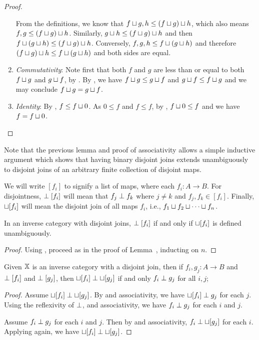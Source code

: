 \begin{proof}
\begin{enumerate}[{(}i{)}]
      From the definitions, we know that $f\sqcup g, h \le (f\sqcup g)\sqcup h$, which also means
      $f, g \le (f\sqcup g)\sqcup h$. Similarly, $g\sqcup h \le (f\sqcup g)\sqcup h $ and then $f
      \sqcup (g\sqcup h)\le (f\sqcup g)\sqcup h$. Conversely, $f,g,h \le f \sqcup (g\sqcup h)$ and
      therefore $(f\sqcup g)\sqcup h \le f \sqcup (g\sqcup h)$ and both sides are equal.
    \item \emph{Commutativity}: Note first that both $f$ and $g$ are less than or equal to both
      $f\sqcup g$ and $g \sqcup f$, by . By , we have $f \sqcup g \le
      g\sqcup f$ and $g\sqcup f \le f \sqcup g$ and we may conclude $f \sqcup g = g \sqcup f$.
    \item \emph{Identity}: By , $f \le f \sqcup 0$. As $0 \le f$ and $f \le f$, by
      , $f \sqcup 0 \le f$ and we have $f = f \sqcup 0$.
  \end{enumerate}
\end{proof}

Note that the previous lemma and proof of associativity allows a simple inductive argument which
shows that having binary disjoint joins extends unambiguously to disjoint joins of an arbitrary
finite collection of disjoint maps.

We will write $[f_i]$ to signify a list of maps, where each $f_i: A \to B$. For disjointness,
$\perp [f_i]$ will mean that $f_j \perp f_k$ where $j\ne k$ and $f_j, f_k \in [f_i]$. Finally,
$\sqcup [f_i]$ will mean the disjoint join of all maps $f_i$, i.e.,
$f_1 \sqcup f_2 \sqcup \cdots \sqcup f_n$.

\begin{lemma}\label{lem:arbitrary_disjoint_joins}
  In an inverse category with disjoint joins, $\perp [f_i]$ if and only if
  $\sqcup [f_i]$ is defined unambiguously.
\end{lemma}
\begin{proof}
  Using , proceed as in the proof of
  Lemma~,
  inducting on $n$.
\end{proof}


\begin{lemma}\label{lem:disjoint_joins_only_when_all_disjoint}
  Given $\mathbb{X}$ is an inverse category with a disjoint join, then if $f_i, g_j : A \to B$ and $\perp
  [f_i]$ and $\perp [g_j]$, then $\sqcup [f_i] \perp \sqcup [g_j]$ if and only $f_i \perp
  g_j$ for all $i,j$;
\end{lemma}
\begin{proof}
  Assume $\sqcup [f_i] \perp \sqcup [g_j]$. By  and associativity, we have
  $\sqcup [f_i] \perp g_j$ for each $j$. Using the reflexivity of $\perp$,
   and associativity, we have $f_i \perp g_j$ for each $i$ and $j$.

  Assume $f_i \perp g_j$ for each $i$ and $j$. Then by  and associativity, $f_i
  \perp \sqcup [g_j]$ for each $i$. Applying  again, we have $\sqcup [f_i] \perp
  \sqcup [g_j]$.
\end{proof}

